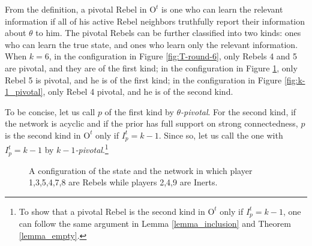 \documentclass[12pt,letter]{article}
\newcommand{\Omicron}{\mathrm{O}}
\theoremstyle{definition}
\theoremstyle{remark}
\theoremstyle{claim}
\begin{document}
From the definition, a pivotal Rebel in $\Omicron^t$ is one who can learn the relevant information if all of his active Rebel neighbors truthfully report their information about $\theta$ to him. The pivotal Rebels can be further classified into two kinds: ones who can learn the true state, and ones who learn only the relevant information. When $k=6$, in the configuration in Figure \ref{fig:T-round-6}, only Rebels 4 and 5 are pivotal, and they are of the first kind; in the configuration in Figure \ref{fig:central_pivotal}, only Rebel 5 is pivotal, and he is of the first kind; in the configuration in Figure \ref{fig:k-1_pivotal}, only Rebel 4 pivotal, and he is of the second kind.

To be concise, let us call $p$ of the first kind by \textit{$\theta$-pivotal}. For the second kind, if the network is acyclic and if the prior has full support on strong connectedness, $p$ is the second kind in $\Omicron^{t}$ only if $I^{t}_p=k-1$. Since so, let us call the one with $I^t_p=k-1$ by \textit{$k-1$-pivotal}.\footnote{To show that a pivotal Rebel is the second kind in $\Omicron^{t}$ only if $I^{t}_p=k-1$, one can follow the same argument in Lemma \ref{lemma_inclusion} and Theorem \ref{lemma_empty}.}

\begin{figure}

\label{fig:central_pivotal}
\begin{center}
\end{center}
\caption{A configuration of the state and the network in which player 1,3,5,4,7,8 are Rebels while players 2,4,9 are Inerts.}
\end{figure}
\end{document}
